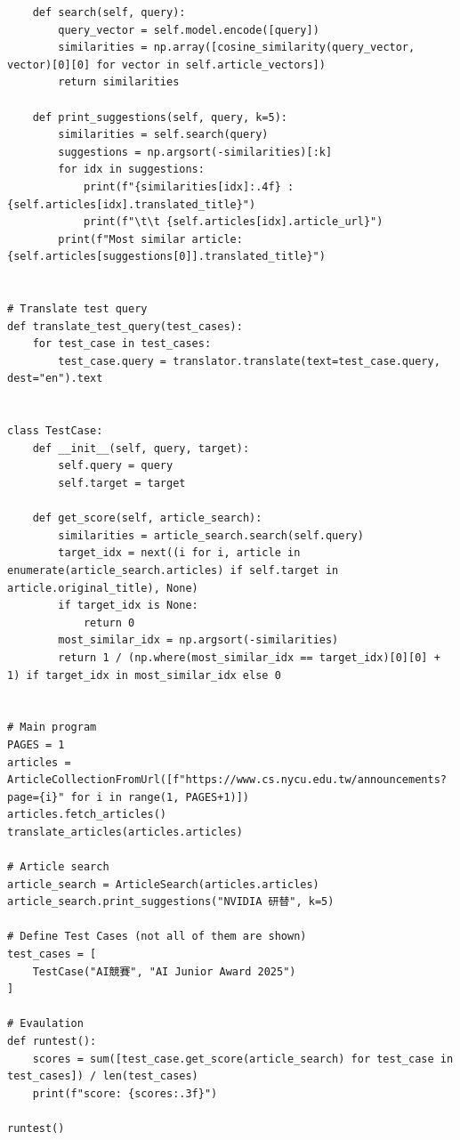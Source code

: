 \begin{lstlisting}
    def search(self, query):
        query_vector = self.model.encode([query])
        similarities = np.array([cosine_similarity(query_vector, vector)[0][0] for vector in self.article_vectors])
        return similarities

    def print_suggestions(self, query, k=5):
        similarities = self.search(query)
        suggestions = np.argsort(-similarities)[:k]
        for idx in suggestions:
            print(f"{similarities[idx]:.4f} : {self.articles[idx].translated_title}")
            print(f"\t\t {self.articles[idx].article_url}")
        print(f"Most similar article: {self.articles[suggestions[0]].translated_title}")


# Translate test query
def translate_test_query(test_cases):
    for test_case in test_cases:
        test_case.query = translator.translate(text=test_case.query, dest="en").text


class TestCase:
    def __init__(self, query, target):
        self.query = query
        self.target = target
    
    def get_score(self, article_search):
        similarities = article_search.search(self.query)
        target_idx = next((i for i, article in enumerate(article_search.articles) if self.target in article.original_title), None)
        if target_idx is None:
            return 0
        most_similar_idx = np.argsort(-similarities)
        return 1 / (np.where(most_similar_idx == target_idx)[0][0] + 1) if target_idx in most_similar_idx else 0


# Main program
PAGES = 1
articles = ArticleCollectionFromUrl([f"https://www.cs.nycu.edu.tw/announcements?page={i}" for i in range(1, PAGES+1)])
articles.fetch_articles()
translate_articles(articles.articles)

# Article search
article_search = ArticleSearch(articles.articles)
article_search.print_suggestions("NVIDIA 研替", k=5)

# Define Test Cases (not all of them are shown)
test_cases = [
    TestCase("AI競賽", "AI Junior Award 2025")
]

# Evaulation
def runtest():
    scores = sum([test_case.get_score(article_search) for test_case in test_cases]) / len(test_cases)
    print(f"score: {scores:.3f}")

runtest()
\end{lstlisting}

